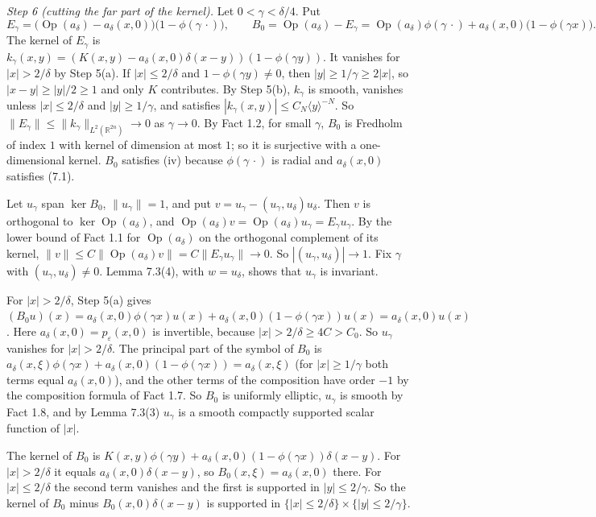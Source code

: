 \documentclass[
  11pt,
]{article}
\begin{document}
\emph{Step 6 (cutting the far part of the kernel).} Let
\(0<\gamma<\delta/4\). Put \[
E_\gamma=\bigl(\operatorname{Op}(a_\delta)-a_\delta(x,0)\bigr)\bigl(1-\phi(\gamma\,\cdot)\bigr),\qquad
B_0=\operatorname{Op}(a_\delta)-E_\gamma=\operatorname{Op}(a_\delta)\phi(\gamma\,\cdot)+a_\delta(x,0)\bigl(1-\phi(\gamma x)\bigr).
\] The kernel of \(E_\gamma\) is
\(k_\gamma(x,y)=(K(x,y)-a_\delta(x,0)\delta(x-y))(1-\phi(\gamma y))\).
It vanishes for \(|x|>2/\delta\) by Step 5(a). If \(|x|\le2/\delta\) and
\(1-\phi(\gamma y)\ne0\), then \(|y|\ge1/\gamma\ge2|x|\), so
\(|x-y|\ge|y|/2\ge1\) and only \(K\) contributes. By Step 5(b),
\(k_\gamma\) is smooth, vanishes unless \(|x|\le2/\delta\) and
\(|y|\ge1/\gamma\), and satisfies
\(|k_\gamma(x,y)|\le C_N\langle y\rangle^{-N}\). So
\(\|E_\gamma\|\le\|k_\gamma\|_{L^2(\mathbb R^{2n})}\to0\) as
\(\gamma\to0\). By Fact 1.2, for small \(\gamma\), \(B_0\) is Fredholm
of index \(1\) with kernel of dimension at most \(1\); so it is
surjective with a one-dimensional kernel. \(B_0\) satisfies (iv) because
\(\phi(\gamma\,\cdot)\) is radial and \(a_\delta(x,0)\) satisfies (7.1).

Let \(u_\gamma\) span \(\ker B_0\), \(\|u_\gamma\|=1\), and put
\(v=u_\gamma-(u_\gamma,u_\delta)u_\delta\). Then \(v\) is orthogonal to
\(\ker\operatorname{Op}(a_\delta)\), and
\(\operatorname{Op}(a_\delta)v=\operatorname{Op}(a_\delta)u_\gamma=E_\gamma u_\gamma\).
By the lower bound of Fact 1.1 for \(\operatorname{Op}(a_\delta)\) on
the orthogonal complement of its kernel,
\(\|v\|\le C\|\operatorname{Op}(a_\delta)v\|=C\|E_\gamma u_\gamma\|\to0\).
So \(|(u_\gamma,u_\delta)|\to1\). Fix \(\gamma\) with
\((u_\gamma,u_\delta)\ne0\). Lemma 7.3(4), with \(w=u_\delta\), shows
that \(u_\gamma\) is invariant.

For \(|x|>2/\delta\), Step 5(a) gives
\((B_0u)(x)=a_\delta(x,0)\phi(\gamma x)u(x)+a_\delta(x,0)(1-\phi(\gamma x))u(x)=a_\delta(x,0)u(x)\).
Here \(a_\delta(x,0)=p_\varepsilon(x,0)\) is invertible, because
\(|x|>2/\delta\ge4C>C_0\). So \(u_\gamma\) vanishes for
\(|x|>2/\delta\). The principal part of the symbol of \(B_0\) is
\(a_\delta(x,\xi)\phi(\gamma x)+a_\delta(x,0)(1-\phi(\gamma x))=a_\delta(x,\xi)\)
(for \(|x|\ge1/\gamma\) both terms equal \(a_\delta(x,0)\)), and the
other terms of the composition have order \(-1\) by the composition
formula of Fact 1.7. So \(B_0\) is uniformly elliptic, \(u_\gamma\) is
smooth by Fact 1.8, and by Lemma 7.3(3) \(u_\gamma\) is a smooth
compactly supported scalar function of \(|x|\).

The kernel of \(B_0\) is
\(K(x,y)\phi(\gamma y)+a_\delta(x,0)(1-\phi(\gamma x))\delta(x-y)\). For
\(|x|>2/\delta\) it equals \(a_\delta(x,0)\delta(x-y)\), so
\(B_0(x,\xi)=a_\delta(x,0)\) there. For \(|x|\le2/\delta\) the second
term vanishes and the first is supported in \(|y|\le2/\gamma\). So the
kernel of \(B_0\) minus \(B_0(x,0)\delta(x-y)\) is supported in
\(\{|x|\le2/\delta\}\times\{|y|\le2/\gamma\}\).
\end{document}
